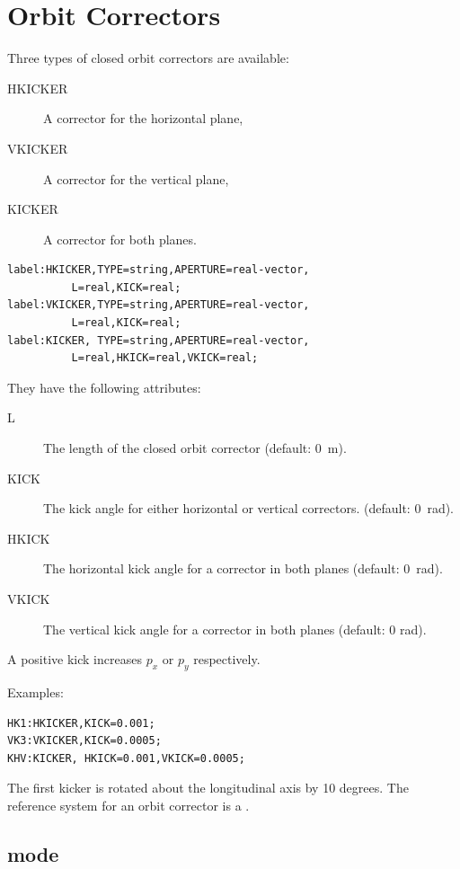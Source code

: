 \section{Orbit Correctors}
\label{sec:corrector}
Three types of closed orbit correctors are available:
\begin{description}
\item[HKICKER]
  \label{sec:hkicker}
  A corrector for the horizontal plane,
\item[VKICKER]
  \label{sec:vkicker}
  A corrector for the vertical plane,
\item[KICKER]
  \label{sec:kicker}
  A corrector for both planes.
\end{description}
\begin{verbatim}
label:HKICKER,TYPE=string,APERTURE=real-vector,
          L=real,KICK=real;
label:VKICKER,TYPE=string,APERTURE=real-vector,
          L=real,KICK=real;
label:KICKER, TYPE=string,APERTURE=real-vector,
          L=real,HKICK=real,VKICK=real;
\end{verbatim}
They have the following attributes:
\begin{description}
\item[L]
  The length of the closed orbit corrector (default: 0~m).
\item[KICK]
  The kick angle for either horizontal or vertical correctors.
  (default: 0~rad).
\item[HKICK]
  The horizontal kick angle for a corrector in both planes
  (default: 0~rad).
\item[VKICK]
  The vertical kick angle for a corrector in both planes
  (default: 0 rad).
\end{description}
A positive kick increases $p_{x}$ or $p_{y}$
respectively.

\noindent Examples:
\begin{verbatim}
HK1:HKICKER,KICK=0.001;
VK3:VKICKER,KICK=0.0005;
KHV:KICKER, HKICK=0.001,VKICK=0.0005;
\end{verbatim}
The first kicker is rotated about the longitudinal axis by 10 degrees.
The reference system for an orbit corrector is a 
.

\subsection{\opalt mode}

